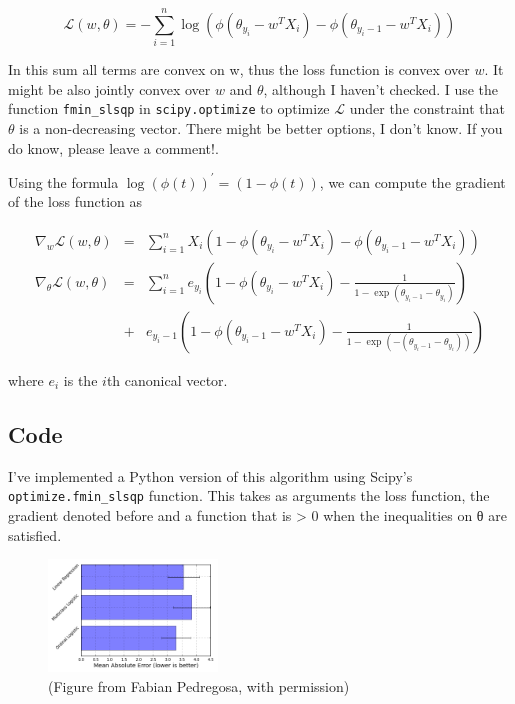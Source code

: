 \begin{equation}
  \mathcal{L}(w, \theta) = - \sum_{i=1}^n \log(\phi(\theta_{y_i} - w^T X_i) -  \phi(\theta_{y_i -1} - w^T X_i))
\end{equation}


In this sum all terms are convex on w, thus the loss function is convex over $w$. It might be also jointly convex over $w$ and $\theta$, although I haven't checked. I use the function \texttt{fmin\_slsqp} in \texttt{scipy.optimize} to optimize $\mathcal{L}$ under the constraint that $\theta$ is a non-decreasing vector. There might be better options, I don't know. If you do know, please leave a comment!.

Using the formula $\log(\phi(t))^\prime = (1 - \phi(t))$, we can compute the gradient of the loss function as


\begin{eqnarray*}
    \nabla_w \mathcal{L}(w, \theta) &=& \sum_{i=1}^n X_i (1 - \phi(\theta_{y_i} - w^T X_i) - \phi(\theta_{y_i-1} - w^T X_i)) \\
    \nabla_\theta \mathcal{L}(w, \theta) &=& \sum_{i=1}^n e_{y_i} \left(1 - \phi(\theta_{y_i} - w^T X_i) - \frac{1}{1 - \exp(\theta_{y_i -1} - \theta_{y_i})}\right)  \\
        \qquad  &+& e_{y_i -1}\left(1 - \phi(\theta_{y_i -1} - w^T X_i) - \frac{1}{1 - \exp(- (\theta_{y_i-1} - \theta_{y_i}))}\right)
\end{eqnarray*}

where $e_i$ is the $i$th canonical vector.

\subsection{Code}

I've implemented a Python version of this algorithm using Scipy's \lstinline{optimize.fmin_slsqp} function. This takes as arguments the loss function, the gradient denoted before and a function that is > 0 when the inequalities on θ are satisfied.

\begin{figure}
  \centering
  \includegraphics[width=0.4\textwidth]{../Images/ordinal_bars.png}
  \caption{(Figure from Fabian Pedregosa, with permission)}
\end{figure}


